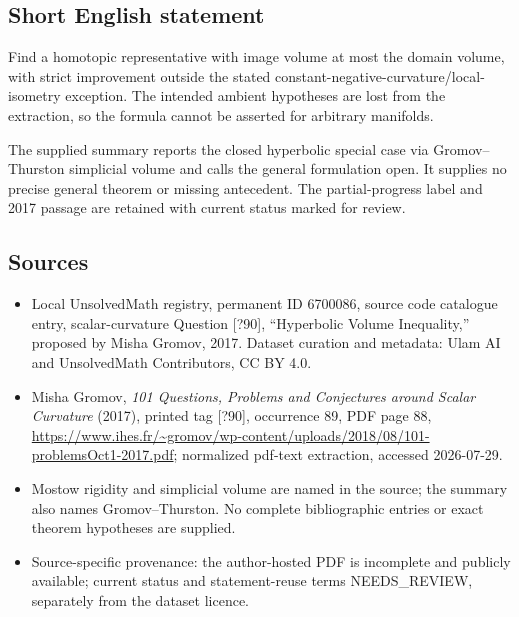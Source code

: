 \documentclass[11pt]{article}
\begin{document}
\subsection{Short English statement}
Find a homotopic representative with image volume at most the domain volume, with strict improvement outside the stated constant-negative-curvature/local-isometry exception. The intended ambient hypotheses are lost from the extraction, so the formula cannot be asserted for arbitrary manifolds.

The supplied summary reports the closed hyperbolic special case via Gromov--Thurston simplicial volume and calls the general formulation open. It supplies no precise general theorem or missing antecedent. The partial-progress label and 2017 passage are retained with current status marked for review.
\subsection{Sources}
\begin{itemize}
\item Local UnsolvedMath registry, permanent ID 6700086, source code catalogue entry, scalar-curvature Question [?90], ``Hyperbolic Volume Inequality,'' proposed by Misha Gromov, 2017. Dataset curation and metadata: Ulam AI and UnsolvedMath Contributors, CC BY 4.0.
\item Misha Gromov, \emph{101 Questions, Problems and Conjectures around Scalar Curvature} (2017), printed tag [?90], occurrence 89, PDF page 88, \url{https://www.ihes.fr/~gromov/wp-content/uploads/2018/08/101-problemsOct1-2017.pdf}; normalized pdf-text extraction, accessed 2026-07-29.
\item Mostow rigidity and simplicial volume are named in the source; the summary also names Gromov--Thurston. No complete bibliographic entries or exact theorem hypotheses are supplied.
\item Source-specific provenance: the author-hosted PDF is incomplete and publicly available; current status and statement-reuse terms NEEDS\_REVIEW, separately from the dataset licence.
\end{itemize}
\end{document}
